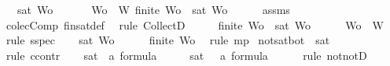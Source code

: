 \begin{isabellebody}
\ \ \ {\isachardoublequoteopen}sat\ Wo{\isachardoublequoteclose}\ \isanewline
%
\isadelimproof
%
\endisadelimproof
%
\isatagproof
{}\isamarkupfalse%
\ {\isacharminus}\isanewline
\ \ \isamarkupfalse%
\ {\isachardoublequoteopen}{\isasymforall}Wo\ {\isasymsubseteq}\ W{\isachardot}\ finite\ Wo\ {\isasymlongrightarrow}\ sat\ Wo{\isachardoublequoteclose}\isanewline
\ \ \ \ \isamarkupfalse%
\ assms{\isacharparenleft}{}{\isacharparenright}\ \isamarkupfalse%
\ colecComp\ fin{\isacharunderscore}sat{\isacharunderscore}def\ \isamarkupfalse%
\ {\isacharparenleft}rule\ CollectD{\isacharparenright}\isanewline
\ \ \isamarkupfalse%
\ \isamarkupfalse%
\ {\isachardoublequoteopen}finite\ Wo\ {\isasymlongrightarrow}\ sat\ Wo{\isachardoublequoteclose}\isanewline
\ \ \ \ \isamarkupfalse%
\ {\isacartoucheopen}Wo\ {\isasymsubseteq}\ W{\isacartoucheclose}\ \isamarkupfalse%
\ {\isacharparenleft}rule\ sspec{\isacharparenright}\isanewline
\ \ \isamarkupfalse%
\ {\isachardoublequoteopen}sat\ Wo{\isachardoublequoteclose}\isanewline
\ \ \ \ \isamarkupfalse%
\ {\isacartoucheopen}finite\ Wo{\isacartoucheclose}\ \isamarkupfalse%
\ {\isacharparenleft}rule\ mp{\isacharparenright}\isanewline
{}\isamarkupfalse%
%
\endisatagproof
{\isafoldproof}%
%
\isadelimproof
\isanewline
%
\endisadelimproof
\isanewline
{}\isamarkupfalse%
\ not{\isacharunderscore}sat{\isacharunderscore}bot{\isacharcolon}\ {\isachardoublequoteopen}{\isasymnot}\ sat\ {\isacharbraceleft}{\isasymbottom}{\isacharbraceright}{\isachardoublequoteclose}\isanewline
%
\isadelimproof
%
\endisadelimproof
%
\isatagproof
{}\isamarkupfalse%
\ {\isacharparenleft}rule\ ccontr{\isacharparenright}\isanewline
\ \ \isamarkupfalse%
\ {\isachardoublequoteopen}{\isasymnot}{\isacharparenleft}{\isasymnot}sat{\isacharbraceleft}{\isasymbottom}\ {\isacharcolon}{\isacharcolon}\ {\isacharprime}a\ formula{\isacharbraceright}{\isacharparenright}{\isachardoublequoteclose}\isanewline
\ \ \isamarkupfalse%
\ \isamarkupfalse%
\ {\isachardoublequoteopen}sat\ {\isacharbraceleft}{\isasymbottom}\ {\isacharcolon}{\isacharcolon}\ {\isacharprime}a\ formula{\isacharbraceright}{\isachardoublequoteclose}\isanewline
\ \ \ \ \isamarkupfalse%
\ {\isacharparenleft}rule\ notnotD{\isacharparenright}\isanewline
\ \ \isamarkupfalse%

\end{isabellebody}
